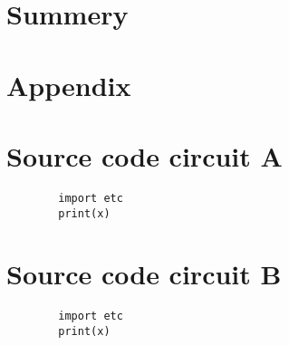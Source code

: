 \documentclass[notitlepage, a4paper, 11pt]{article}
\begin{document}
	\section{Summery}
	\newpage
	\appendix
	\section*{Appendix}\label{Appendix}
	\section{Source code circuit A}
	\begin{verbatim}
		import etc
		print(x)
	\end{verbatim}
	\label{code:A}
	\section{Source code circuit B}
	\begin{verbatim}
		import etc
		print(x)
	\end{verbatim}
	\label{code:B}
\end{document}
